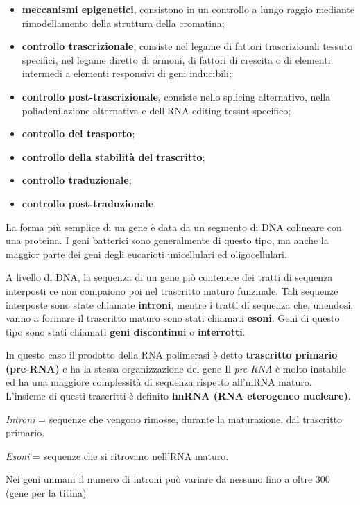 \documentclass[11pt]{book}
\begin{document}
\begin{itemize}
\itemsep1pt\parskip0pt
\item
  \textbf{meccanismi epigenetici}, consistono in un controllo a lungo
  raggio mediante rimodellamento della struttura della cromatina;
\item
  \textbf{controllo trascrizionale}, consiste nel legame di fattori
  trascrizionali tessuto specifici, nel legame diretto di ormoni, di
  fattori di crescita o di elementi intermedi a elementi responsivi di
  geni inducibili;
\item
  \textbf{controllo post-trascrizionale}, consiste nello splicing
  alternativo, nella poliadenilazione alternativa e dell'RNA editing
  tessut-specifico;
\item
  \textbf{controllo del trasporto};
\item
  \textbf{controllo della stabilità del trascritto};
\item
  \textbf{controllo traduzionale};
\item
  \textbf{controllo post-traduzionale}.
\end{itemize}

La forma più semplice di un gene è data da un segmento di DNA colineare
con una proteina. I geni batterici sono generalmente di questo tipo, ma
anche la maggior parte dei geni degli eucarioti unicellulari ed
oligocellulari.

A livello di DNA, la sequenza di un gene piò contenere dei tratti di
sequenza interposti ce non compaiono poi nel trascritto maturo
funzinale. Tali sequenze interposte sono state chiamate
\textbf{introni}, mentre i tratti di sequenza che, unendosi, vanno a
formare il trascritto maturo sono stati chiamati \textbf{esoni}. Geni di
questo tipo sono stati chiamati \textbf{geni discontinui} o
\textbf{interrotti}.

In questo caso il prodotto della RNA polimerasi è detto
\textbf{trascritto primario (pre-RNA)} e ha la stessa organizzazione del
gene Il \emph{pre-RNA} è molto instabile ed ha una maggiore complessità
di sequenza rispetto all'mRNA maturo. L'insieme di questi trascritti è
definito \textbf{hnRNA (RNA eterogeneo nucleare)}.

\emph{Introni} = sequenze che vengono rimosse, durante la maturazione,
dal trascritto primario.

\emph{Esoni} = sequenze che si ritrovano nell'RNA maturo.

Nei geni unmani il numero di introni può variare da nessuno fino a oltre
300 (gene per la titina)
\end{document}
